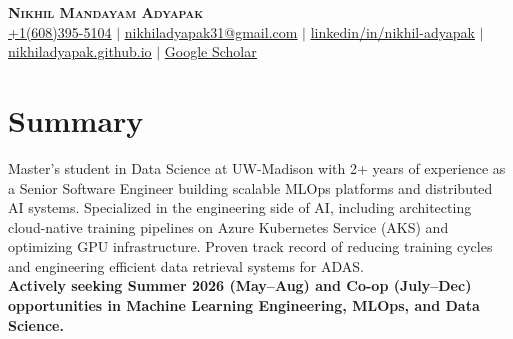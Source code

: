 \documentclass[letterpaper,11pt]{article}
\begin{document}

\newcommand{\makeboxlabel}[1]{\fbox{#1.}\hfill}%
\newenvironment{boxlabel}
  {\begin{list}
    {\arabic{boxlblcounter}}
    {\usecounter{boxlblcounter}
     \setlength{\labelwidth}{3em}
     \setlength{\labelsep}{0em}
     \setlength{\itemsep}{2pt}
     \setlength{\leftmargin}{1.5cm}
     \setlength{\rightmargin}{2cm}
     \setlength{\itemindent}{0em} 
     \let\makelabel=\makeboxlabel
    }
  }
{\end{list}}


\begin{center}
    \textbf{\Huge \scshape Nikhil Mandayam Adyapak} \\ \vspace{2.5pt}
    \small \href{https://wa.me/917349304990?text=Hello!+I'm+<your+name>%2C+and+I've+found+you+via+your+resume.+I+am+reaching+out+because+<...>}{\underline{+1(608)395-5104}} $|$ \href{mailto:nikhiladyapak31@gmail.com}{\underline{nikhiladyapak31@gmail.com}} $|$ 
    \href{https://www.linkedin.com/in/nikhil-adyapak/}{\underline{linkedin/in/nikhil-adyapak}} $|$
    \href{https://nikhiladyapak.github.io/}{\underline{nikhiladyapak.github.io}} $|$
    \href{https://scholar.google.com/citations?hl=en&user=VAOBlIMAAAAJ}{\underline{Google Scholar}}
\end{center}

\section{Summary}
  \small{
  Master’s student in Data Science at UW-Madison with 2+ years of experience as a Senior Software Engineer building scalable MLOps platforms and distributed AI systems. Specialized in the engineering side of AI, including architecting cloud-native training pipelines on Azure Kubernetes Service (AKS) and optimizing GPU infrastructure. Proven track record of reducing training cycles and engineering efficient data retrieval systems for ADAS. \\ \textbf{Actively seeking Summer 2026 (May–Aug) and Co-op (July–Dec) opportunities in Machine Learning Engineering, MLOps, and Data Science.}
  }
\end{document}
